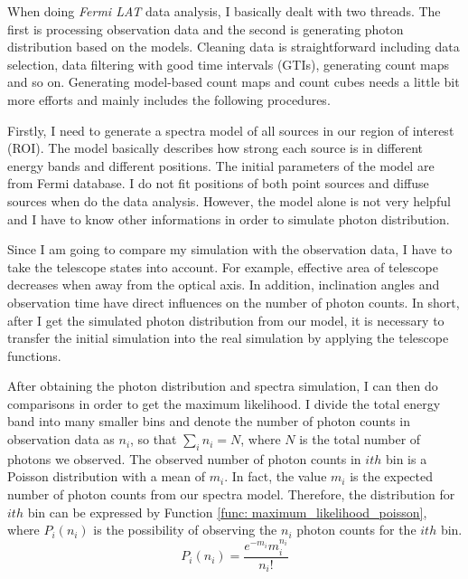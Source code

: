 \documentclass[12pt]{report}
\begin{document}
            When doing \textit{Fermi LAT} data analysis, I basically dealt with two threads. The first is 
            processing observation data and the second is generating photon distribution based on 
            the models. Cleaning data is straightforward including data selection, data filtering with 
            good time intervals (GTIs), generating count maps and so on. Generating model-based count 
            maps and count cubes needs a little bit more efforts and mainly includes the following 
            procedures. 

            Firstly, I need to generate a spectra model of all sources in our region of interest (ROI).
            The model basically describes how strong each source is in different energy bands and 
            different positions. The initial parameters of the model are from Fermi database. I do not fit 
            positions of both point sources and diffuse sources when do the data analysis. 
            However, the model alone is not very helpful and I have to know other 
            informations in order to simulate photon distribution. 

            Since I am going to compare my simulation with the observation data, I have to 
            take the telescope states into account. For example, 
            effective area of telescope decreases when away from the optical axis. 
            In addition, inclination angles and observation time have direct influences on the 
            number of photon counts. In short, after I get the simulated photon distribution from 
            our model, it is necessary to transfer the initial simulation into the real simulation by applying 
            the telescope functions. 
            
            After obtaining the photon distribution and spectra simulation, 
            I can then do comparisons in order to get 
            the maximum likelihood. I divide the total energy band into many smaller bins and denote
            the number of photon counts in observation data as $n_{i}$, so that $\sum_{i}^{}n_{i} = N$, 
            where $N$ is the total number of photons we observed. The observed number of photon counts
            in $ith$ bin is a Poisson distribution with a mean of $m_{i}$. In fact, the value $m_{i}$ is the 
            expected number of photon counts from our spectra model. Therefore, the distribution for $ith$ bin
            can be expressed by Function \ref{func: maximum_likelihood_poisson}, where 
            $P_{i}\left(n_{i}\right)$ is the possibility of observing the $n_{i}$ photon counts for the $ith$
            bin. 
          \begin{equation}
            P_{i}\left(n_{i}\right) = \frac{e^{-m_{i}} m_{i}^{n_{i}}}{n_{i}!}
            \label{func: maximum_likelihood_poisson}
          \end{equation}
\end{document}
